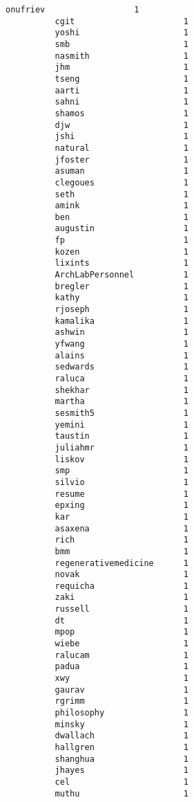 \documentclass[11pt]{article}
\begin{document}
\begin{Verbatim}[commandchars=\\\{\}]
          onufriev                  1
          cgit                      1
          yoshi                     1
          smb                       1
          nasmith                   1
          jhm                       1
          tseng                     1
          aarti                     1
          sahni                     1
          shamos                    1
          djw                       1
          jshi                      1
          natural                   1
          jfoster                   1
          asuman                    1
          clegoues                  1
          seth                      1
          amink                     1
          ben                       1
          augustin                  1
          fp                        1
          kozen                     1
          lixints                   1
          ArchLabPersonnel          1
          bregler                   1
          kathy                     1
          rjoseph                   1
          kamalika                  1
          ashwin                    1
          yfwang                    1
          alains                    1
          sedwards                  1
          raluca                    1
          shekhar                   1
          martha                    1
          sesmith5                  1
          yemini                    1
          taustin                   1
          juliahmr                  1
          liskov                    1
          smp                       1
          silvio                    1
          resume                    1
          epxing                    1
          kar                       1
          asaxena                   1
          rich                      1
          bmm                       1
          regenerativemedicine      1
          novak                     1
          requicha                  1
          zaki                      1
          russell                   1
          dt                        1
          mpop                      1
          wiebe                     1
          ralucam                   1
          padua                     1
          xwy                       1
          gaurav                    1
          rgrimm                    1
          philosophy                1
          minsky                    1
          dwallach                  1
          hallgren                  1
          shanghua                  1
          jhayes                    1
          cel                       1
          muthu                     1

\end{Verbatim}
\end{document}
